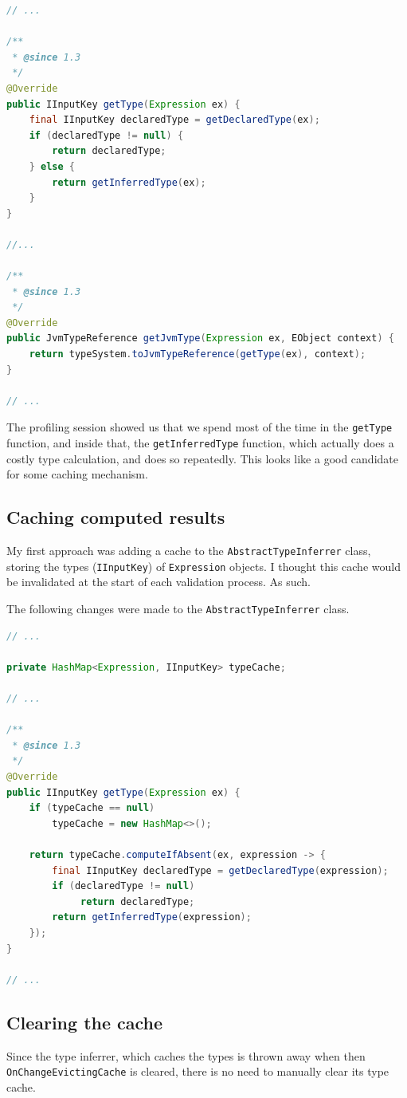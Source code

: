 \documentclass[11pt,a4paper,oneside]{report}
\begin{document}
\begin{lstlisting}[language=java]
// ...

/**
 * @since 1.3
 */
@Override
public IInputKey getType(Expression ex) {
    final IInputKey declaredType = getDeclaredType(ex);
    if (declaredType != null) {
        return declaredType;
    } else {
        return getInferredType(ex);
    }
}

//...

/**
 * @since 1.3
 */
@Override
public JvmTypeReference getJvmType(Expression ex, EObject context) {
    return typeSystem.toJvmTypeReference(getType(ex), context);
}

// ...
\end{lstlisting}

The profiling session showed us that we spend most of the time in the
\texttt{getType} function, and inside that, the \texttt{getInferredType}
function, which actually does a costly type calculation, and does so repeatedly.
This looks like a good candidate for some caching mechanism.

\subsection{Caching computed results}
My first approach was adding a cache to the \texttt{AbstractTypeInferrer} class,
storing the types (\texttt{IInputKey}) of \texttt{Expression} objects. I thought
this cache would be invalidated at the start of each validation process. As
such.

The following changes were made to the \texttt{AbstractTypeInferrer} class.

\begin{lstlisting}[language=java]
// ...

private HashMap<Expression, IInputKey> typeCache;

// ...

/**
 * @since 1.3
 */
@Override
public IInputKey getType(Expression ex) {
    if (typeCache == null)
        typeCache = new HashMap<>();

    return typeCache.computeIfAbsent(ex, expression -> {
        final IInputKey declaredType = getDeclaredType(expression);
        if (declaredType != null)
             return declaredType;
        return getInferredType(expression);
    });
}

// ...
\end{lstlisting}

\subsection{Clearing the cache}
Since the type inferrer, which caches the types is thrown away when then
\texttt{OnChangeEvictingCache} is cleared, there is no need to manually clear
its type cache.
\end{document}
